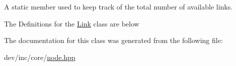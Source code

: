 A static member used to keep track of the total number of available links. 

The Definitions for the \hyperlink{classLink}{Link} class are below 

The documentation for this class was generated from the following file\+:\begin{DoxyCompactItemize}
\item 
dev/inc/core/\hyperlink{node_8hpp}{node.\+hpp}\end{DoxyCompactItemize}
